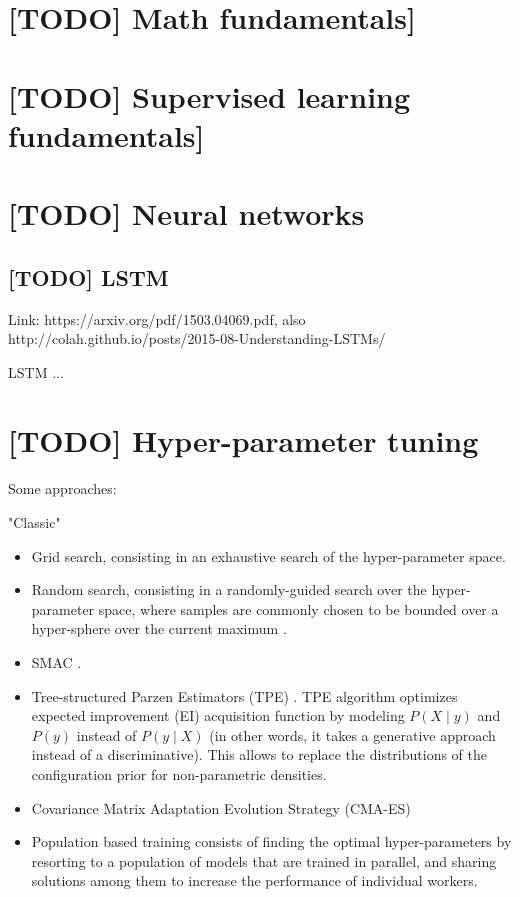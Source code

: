 \documentclass[12pt, english]{article}
\begin{document}
\tableofcontents

\newpage

\section{[TODO] Math fundamentals]}

\section{[TODO] Supervised learning fundamentals]}

\section{[TODO] Neural networks}

\subsection{[TODO] LSTM}

Link: https://arxiv.org/pdf/1503.04069.pdf, also http://colah.github.io/posts/2015-08-Understanding-LSTMs/

LSTM \cite{hochreiter_long_1997} \cite{greff_lstm_2017} ...

\section{[TODO] Hyper-parameter tuning}

Some approaches:

"Classic"

\begin{itemize}
  \item Grid search, consisting in an exhaustive search of the hyper-parameter space.
  \item Random search, consisting in a randomly-guided search over the hyper-parameter space, where samples are commonly chosen to be bounded over a hyper-sphere over the current maximum \cite{bergstra_random_2012}.
\end{itemize}

\begin{itemize}
  \item SMAC \cite{hutter_sequential_2011}.
  \item Tree-structured Parzen Estimators (TPE) \cite{bergstra_algorithms_2011}. TPE algorithm optimizes expected improvement (EI) acquisition function by modeling $P(X \mid y)$ and $P(y)$ instead of $P(y \mid X)$ (in other words, it takes a generative approach instead of a discriminative). This allows to replace the distributions of the configuration prior for non-parametric densities.
  \item Covariance Matrix Adaptation Evolution Strategy (CMA-ES) \cite{loshchilov_cma-es_2016}
  \item Population based training \cite{jaderberg_population_2017} consists of finding the optimal hyper-parameters by resorting to a population of models that are trained in parallel, and sharing solutions among them to increase the performance of individual workers.
\end{itemize}
\end{document}
